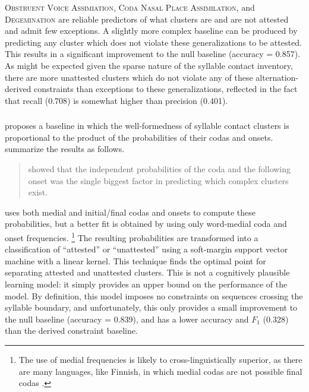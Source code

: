 \textsc{Obstruent Voice Assimiation}, \textsc{Coda Nasal Place Assimilation}, and \textsc{Degemination} are reliable predictors of what clusters are and are not attested and admit few exceptions. A slightly more complex baseline can be produced by predicting any cluster which does not violate these generalizations to be attested. This results in a significant improvement to the null baseline (accuracy = 0.857). As might be expected given the sparse nature of the syllable contact inventory, there are more unattested clusters which do not violate any of these alternation-derived constraints than exceptions to these generalizations, reflected in the fact that recall (0.708) is somewhat higher than precision (0.401). 

\subsubsection{\citet{Pierrehumbert1994}}

\citet{Pierrehumbert1994} proposes a baseline in which the well-formedness of syllable contact clusters is proportional to the product of the probabilities of their codas and onsets. \citeauthor{Coleman1997} summarize the results as follows.

\begin{quote}
\citet{Pierrehumbert1994} showed that the independent probabilities of the coda and the following onset was the single biggest factor in predicting which complex clusters exist. \citep[50]{Coleman1997}
\end{quote}

\noindent \citet{Pierrehumbert1994} uses both medial and initial/final codas and onsets to compute these probabilities, but a better fit is obtained by using only word-medial coda and onset frequencies. \footnote{The use of medial frequencies is likely to cross-linguistically superior, as there are many languages, like Finnish, in which medial codas are not possible final codas \citep[][306]{Fischer-Jorgensen1952}.} The resulting probabilities are transformed into a classification of ``attested'' or ``unattested'' using a soft-margin support vector machine \citep{Cortes1995} with a linear kernel. This technique finds the optimal point for separating attested and unattested clusters. This is not a cognitively plausible learning model: it simply provides an upper bound on the performance of the \citeauthor{Pierrehumbert1994} model. By definition, this model imposes no constraints on sequences crossing the syllable boundary, and unfortunately, this only provides a small improvement to the null baseline (accuracy = 0.839), and has a lower accuracy and $F_1$ (0.328) than the derived constraint baseline. 

